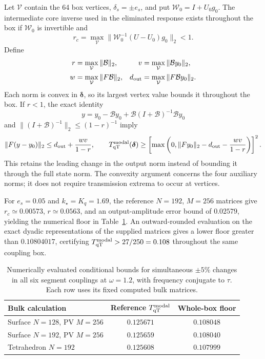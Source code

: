 \documentclass[10pt,aps,onecolumn,notitlepage,nofootinbib]{revtex4-2}
\newcommand{\qT}{\mathrm{qT}}
\begin{document}
Let $\mathcal V$ contain the 64 box vertices, $\delta_s=\pm e_s$, and put $\mathcal W_0=I+U_0g_0$. The intermediate core inverse used in the eliminated response exists throughout the box if $\mathcal W_0$ is invertible and
\begin{equation}
 r_c=\max_{\mathcal V}\|\mathcal W_0^{-1}(U-U_0)g_0\|_2<1.
 \label{eq:sm-box-core}
\end{equation}
Define
\begin{align}
 r&=\max_{\mathcal V}\|\mathcal B\|_2,&
 v&=\max_{\mathcal V}\|\mathcal B y_0\|_2,\\
 w&=\max_{\mathcal V}\|F\mathcal B\|_2,&
 d_{\rm out}&=\max_{\mathcal V}\|F\mathcal B y_0\|_2.
 \label{eq:sm-box-maxima}
\end{align}
Each norm is convex in $\bm\delta$, so its largest vertex value bounds it throughout the box. If $r<1$, the exact identity
\begin{equation}
 y=y_0-\mathcal B y_0+\mathcal B(I+\mathcal B)^{-1}\mathcal B y_0
\end{equation}
and $\|(I+\mathcal B)^{-1}\|_2\leq(1-r)^{-1}$ imply
\begin{equation}
 \|F(y-y_0)\|_2\leq d_{\rm out}+\frac{wv}{1-r},\qquad
 T_{\qT}^{\rm modal}(\bm\delta)\geq
 \left[\max\left(0,\|Fy_0\|_2-d_{\rm out}-\frac{wv}{1-r}\right)\right]^2.
 \label{eq:sm-box-floor}
\end{equation}
This retains the leading change in the output norm instead of bounding it through the full state norm. The convexity argument concerns the four auxiliary norms; it does not require transmission extrema to occur at vertices.

For $e_s=0.05$ and $k_\star=K_q=1.69$, the reference $N=192$, $M=256$ matrices give $r_c\simeq0.00573$, $r\simeq0.0563$, and an output-amplitude error bound of $0.02579$, yielding the numerical floor in Table~\ref{tab:sm-box-floor}. An outward-rounded evaluation on the exact dyadic representations of the supplied matrices gives a lower floor greater than $0.10804017$, certifying $T_{\qT}^{\rm modal}>27/250=0.108$ throughout the same coupling box.

\begin{table}[htbp]
\centering
\caption{Numerically evaluated conditional bounds for simultaneous $\pm5\%$ changes in all six segment couplings at $\omega=1.2$, with frequency conjugate to $\tau$. Each row uses its fixed computed bulk matrices.}
\label{tab:sm-box-floor}
\begin{tabular}{lcc}
\toprule
Bulk calculation & Reference $T_{\qT}^{\rm modal}$ & Whole-box floor\\
\midrule
Surface $N=128$, PV $M=256$ & $0.125671$ & $0.108048$\\
Surface $N=192$, PV $M=256$ & $0.125659$ & $0.108040$\\
Tetrahedron $N=192$ & $0.125608$ & $0.107999$\\
\bottomrule
\end{tabular}
\end{table}
\end{document}
